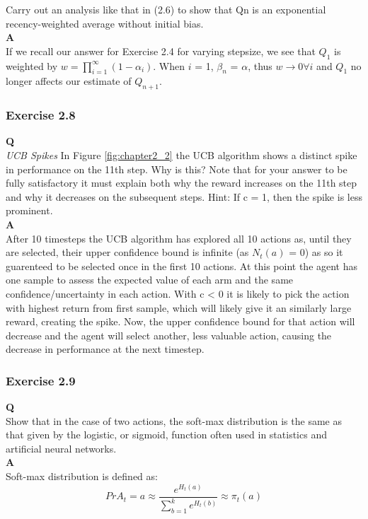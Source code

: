 Carry out an analysis like that in (2.6) to show that Qn is an exponential recency-weighted
average without initial bias.\\

\textbf{A}\\
If we recall our answer for Exercise 2.4 for varying stepsize, we see that \(Q_1\) is weighted by \(w = \prod_{i=1}^{\infty} (1 - \alpha_i)\). When \(i\) = 1, \(\beta_n\) = \(\alpha\), thus \(w \rightarrow 0 \forall i\) and \(Q_1\) no longer affects our estimate of \(Q_{n+1}\).

\subsubsection{Exercise 2.8}
\textbf{Q}\\
\textit{UCB Spikes} In Figure \ref{fig:chapter2_2} the UCB algorithm shows a distinct spike in performance on the 11th step. Why is this? Note that for your answer to be fully satisfactory it must explain both why the reward increases on the 11th step and why it decreases on the subsequent steps. Hint: If c = 1, then the spike is less prominent.\\

\textbf{A}\\
After 10 timesteps the UCB algorithm has explored all 10 actions as, until they are selected, their upper confidence bound is infinite (as \(N_t(a)\) = 0) as so it guarenteed to be selected once in the first 10 actions. At this point the agent has one sample to assess the expected value of each arm and the same confidence/uncertainty in each action. With c < 0 it is likely to pick the action with highest return from first sample, which will likely give it an similarly large reward, creating the spike. Now, the upper confidence bound for that action will decrease and the agent will select another, less valuable action, causing the decrease in performance at the next timestep.
\subsubsection{Exercise 2.9}
\textbf{Q}\\
Show that in the case of two actions, the soft-max distribution is the same as that given by the logistic, or sigmoid, function often used in statistics and artificial neural networks.\\

\textbf{A}\\
Soft-max distribution is defined as:
\begin{equation}
	Pr{A_t = a} \approx \frac{e^{H_t(a)}}{\sum_{b=1}^{k} e^{H_t(b)}} \approx \pi_t(a)
\end{equation}

